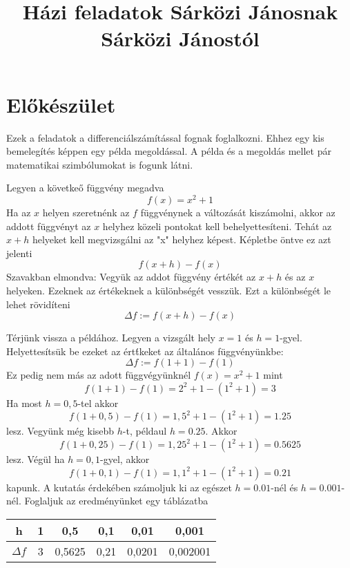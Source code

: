 \documentclass[11pt, a4paper]{article}
\title{%
  H\'azi feladatok S\'arközi J\'anosnak \\
  \large S\'arközi J\'anost\'ol}
\begin{document}
\maketitle
\section{El\H{o}k\'eszület}
Ezek a feladatok a differenci\'alsz\'am\'it\'assal fognak foglalkozni. Ehhez
egy kis bemeleg\'it\'es k\'eppen egy p\'elda megold\'assal. A p\'elda \'es a
megold\'as mellet p\'ar matematikai szimb\'olumokat is fogunk l\'atni.

Legyen a követke\H{o} függv\'eny megadva
\[
    f(x) = x^2+1
\]
Ha az $x$ helyen szeretn\'enk az $f$ függv\'enynek a v\'altoz\'as\'at
kisz\'amolni, akkor az addott függv\'enyt az $x$ helyhez közeli pontokat kell
behelyettes\'iteni. Teh\'at az $x+h$ helyeket kell megvizsg\'alni az "x"
helyhez k\'epest. K\'epletbe öntve ez azt jelenti
\[
    f(x+h) - f(x)
\]
Szavakban elmondva: Vegyük az addot függv\'eny \'ert\'ek\'et az $x+h$ \'es az
$x$ helyeken. Ezeknek az \'ert\'ekeknek a különbs\'eg\'et vesszük. Ezt a
különbs\'eg\'et le lehet rövid\'iteni
\[
    \Delta f := f(x+h) - f(x)
\]

T\'erjünk vissza a p\'eld\'ahoz. Legyen a vizsg\'alt hely $x=1$ \'es $h=1$-gyel.
Helyettes\'itsük be ezeket az \'ert\'tkeket az \'altal\'anos függv\'enyünkbe:
\[
    \Delta f := f(1+1) - f(1)
\]
Ez pedig nem m\'as az adott függv\'együnkn\'el $f(x)=x^2+1$ mint
\[
    f(1+1) - f(1) = 2^2+1 - (1^2+1) = 3
\]
Ha most $h=0,5$-tel akkor
\[
    f(1+0,5) - f(1) = 1,5^2+1 - (1^2+1) = 1.25
\]
lesz. Vegyünk m\'eg kisebb $h$-t, p\'eldaul $h=0.25$. Akkor
\[
    f(1+0,25) - f(1) = 1,25^2+1 - (1^2+1) = 0.5625
\]
lesz. V\'egül ha $h=0,1$-gyel, akkor
\[
    f(1+0,1) - f(1) = 1,1^2+1 - (1^2+1) = 0.21
\]
kapunk. A kutat\'as \'erdek\'eben sz\'amoljuk ki az eg\'eszet $h=0.01$-n\'el \'es $h=0.001$-n\'el. Foglaljuk az eredm\'enyünket egy t\'abl\'azatba

\begin{center}
\begin{tabular}{ c|c|c|c|c|c } 
    h        & 1 & 0,5    & 0,1  & 0,01   & 0,001 \\ 
 \hline
    $\Delta f$ & 3 & 0,5625 & 0,21 & 0,0201 & 0,002001 \\
\end{tabular}
\end{center}
\end{document}
